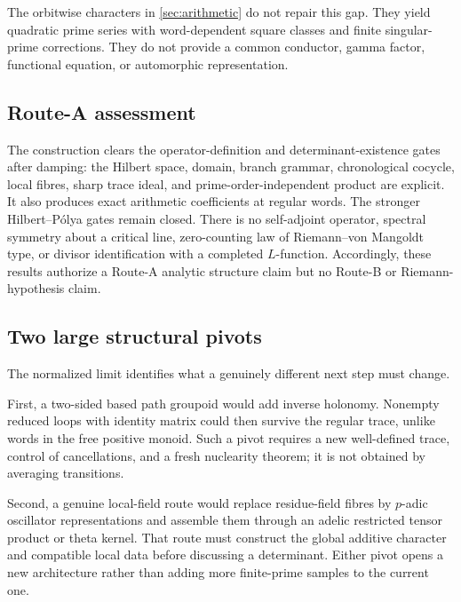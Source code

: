 The orbitwise characters in \cref{sec:arithmetic} do not repair this gap.
They yield quadratic prime series with word-dependent square classes and
finite singular-prime corrections.  They do not provide a common conductor,
gamma factor, functional equation, or automorphic representation.

\subsection{Route-A assessment}

The construction clears the operator-definition and determinant-existence
gates after damping: the Hilbert space, domain, branch grammar, chronological
cocycle, local fibres, sharp trace ideal, and prime-order-independent product
are explicit.  It also produces exact arithmetic coefficients at regular
words.  The stronger Hilbert--P\'olya gates remain closed.  There is no
self-adjoint operator, spectral symmetry about a critical line, zero-counting
law of Riemann--von Mangoldt type, or divisor identification with a completed
\(L\)-function.  Accordingly, these results authorize a Route-A analytic
structure claim but no Route-B or Riemann-hypothesis claim.

\subsection{Two large structural pivots}

The normalized limit identifies what a genuinely different next step must
change.

First, a two-sided based path groupoid would add inverse holonomy.  Nonempty
reduced loops with identity matrix could then survive the regular trace,
unlike words in the free positive monoid.  Such a pivot requires a new
well-defined trace, control of cancellations, and a fresh nuclearity theorem;
it is not obtained by averaging transitions.

Second, a genuine local-field route would replace residue-field fibres by
\(p\)-adic oscillator representations and assemble them through an adelic
restricted tensor product or theta kernel.  That route must construct the
global additive character and compatible local data before discussing a
determinant.  Either pivot opens a new architecture rather than adding more
finite-prime samples to the current one.
